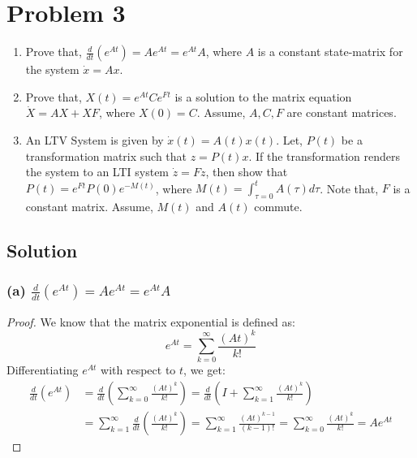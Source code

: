 \section*{Problem 3}

\begin{enumerate}[label= (\alph*)]
      \item Prove that, \( \frac{d}{d t}\left(e^{A t}\right)=A e^{A t}=e^{A t} A \), where \( A \) is a constant state-matrix for the system \( \dot{x}=A x \).
      \item Prove that, \( X(t)=e^{A t} C e^{F t} \) is a solution to the matrix equation \( \dot{X}=A X+X F \), where \( X(0)=C \).
            Assume, \( A, C, F \) are constant matrices.
      \item An LTV System is given by \( \dot{x}(t)=A(t) x(t) \). Let, \( P(t) \) be a transformation matrix such that \( z=P(t) x \).
            If the transformation renders the system to an LTI system \( \dot{z}=F z \), then show that \( P(t)=e^{F t} P(0) e^{-M(t)} \), where \( M(t)=\int_{\tau=0}^{t} A(\tau) d \tau \).
            Note that, \( F \) is a constant matrix.
            Assume, \( M(t) \) and \( A(t) \) commute.
\end{enumerate}

\subsection*{Solution}

\subsubsection*{(a) \( \frac{d}{d t}\left(e^{A t}\right)=A e^{A t}=e^{A t} A \)}

\begin{proof}
      We know that the matrix exponential is defined as:
      \begin{equation*}
            e^{A t}=\sum_{k=0}^{\infty} \frac{(A t)^{k}}{k !}
      \end{equation*}
      Differentiating \( e^{A t} \) with respect to \( t \), we get:
      \begin{align*}
            \frac{d}{d t}\left(e^{A t}\right)
             & =
            \frac{d}{d t}\left(\sum_{k=0}^{\infty} \frac{(A t)^{k}}{k !}\right)
            =
            \frac{d}{d t}\left(I + \sum_{k=1}^{\infty} \frac{(A t)^{k}}{k !}\right)
            \\ & =
            \sum_{k=1}^{\infty} \frac{d}{d t}\left(\frac{(A t)^{k}}{k !}\right)
            =
            \sum_{k=1}^{\infty} \frac{{(A t)}^{k-1}}{(k-1) !}
            =
            \sum_{k=0}^{\infty} \frac{{(A t)}^k}{k !}
            =
            A e^{A t}
      \end{align*}
\end{proof}

